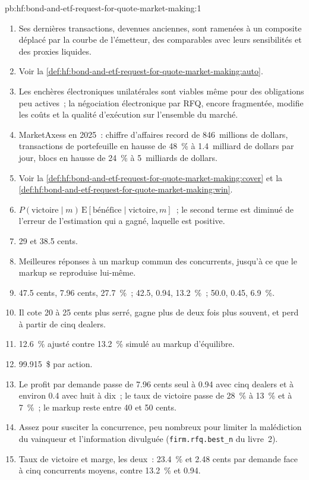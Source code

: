 \begin{solution}{pb:hf:bond-and-etf-request-for-quote-market-making:1}
\begin{enumerate}
\item Ses dernières transactions, devenues anciennes, sont ramenées à un composite déplacé par la courbe de l'émetteur, des comparables avec leurs sensibilités et des proxies liquides.
\item Voir la \cref{def:hf:bond-and-etf-request-for-quote-market-making:auto}.
\item Les enchères électroniques unilatérales sont viables même pour des obligations peu actives~; la négociation électronique par RFQ, encore fragmentée, modifie les coûts et la
qualité d'exécution sur l'ensemble du marché.
\item MarketAxess en 2025~: chiffre d'affaires record de 846~millions de dollars, transactions de portefeuille en hausse de 48~\% à 1.4~milliard de dollars par jour, blocs en hausse de 24~\% à 5~milliards de dollars.
\item Voir la \cref{def:hf:bond-and-etf-request-for-quote-market-making:cover} et la \cref{def:hf:bond-and-etf-request-for-quote-market-making:win}.
\item $P(\text{victoire}\mid m)\,\mathrm{E}[\text{bénéfice}\mid\text{victoire},m]$~; le second terme est diminué de l'erreur de l'estimation qui a gagné, laquelle est
positive.
\item 29 et 38.5 cents.
\item Meilleures réponses à un markup commun des concurrents, jusqu'à ce que le markup se reproduise lui-même.
\item 47.5 cents, 7.96 cents, 27.7~\%~; 42.5, 0.94, 13.2~\%~; 50.0, 0.45, 6.9~\%.
\item Il cote 20 à 25 cents plus serré, gagne plus de deux fois plus souvent, et perd à partir de cinq dealers.
\item 12.6~\% ajusté contre 13.2~\% simulé au markup d'équilibre.
\item 99.915~\$ par action.
\item Le profit par demande passe de 7.96 cents seul à 0.94 avec cinq dealers et à environ 0.4 avec huit à dix~; le taux de victoire passe de 28~\% à 13~\% et
à 7~\%~; le markup reste entre 40 et 50 cents.
\item Assez pour susciter la concurrence, peu nombreux pour limiter la malédiction du vainqueur et l'information divulguée (\texttt{firm.rfq.best\_n} du livre~2).
\item Taux de victoire et marge, les deux~: 23.4~\% et 2.48 cents par demande face à cinq concurrents moyens, contre 13.2~\% et 0.94.

\end{enumerate}
\end{solution}
